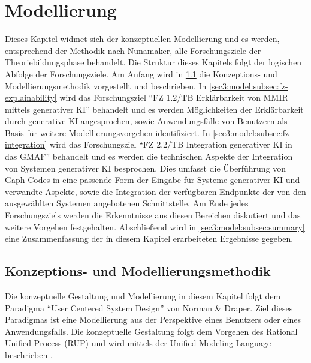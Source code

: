 \section{Modellierung}
\label{sec3:model}
Dieses Kapitel widmet sich der konzeptuellen Modellierung und es werden, entsprechend der Methodik nach Nunamaker, alle Forschungsziele der Theoriebildungsphase behandelt.
Die Struktur dieses Kapitels folgt der logischen Abfolge der Forschungsziele.
Am Anfang wird in \cref{sec3:model:subsec:concept-modeling-methodology} die Konzeptions- und Modellierungsmethodik vorgestellt und beschrieben.
In \cref{sec3:model:subsec:fz-explainability} wird das Forschungsziel \enquote{FZ 1.2/TB Erklärbarkeit von MMIR mittels generativer KI} behandelt und es werden Möglichkeiten der Erklärbarkeit durch generative KI angesprochen, sowie Anwendungsfälle von Benutzern als Basis für weitere Modellierungsvorgehen identifiziert.
In \cref{sec3:model:subsec:fz-integration} wird das Forschungsziel \enquote{FZ 2.2/TB Integration generativer KI in das GMAF} behandelt und es werden die technischen Aspekte der Integration von Systemen generativer KI besprochen.
Dies umfasst die Überführung von Gaph Codes in eine passende Form der Eingabe für Systeme generativer KI und verwandte Aspekte, sowie die Integration der verfügbaren Endpunkte der von den ausgewählten Systemen angebotenen Schnittstelle.
Am Ende jedes Forschungsziels werden die Erkenntnisse aus diesen Bereichen diskutiert und das weitere Vorgehen festgehalten.
Abschließend wird in \cref{sec3:model:subsec:summary} eine Zusammenfassung der in diesem Kapitel erarbeiteten Ergebnisse gegeben.



\subsection{Konzeptions- und Modellierungsmethodik}
\label{sec3:model:subsec:concept-modeling-methodology}
Die konzeptuelle Gestaltung und Modellierung in diesem Kapitel folgt dem Paradigma \enquote{User Centered System Design} \cite{norman-draper-user-centered-system-design} von Norman \& Draper.
Ziel dieses Paradigmas ist eine Modellierung aus der Perspektive eines Benutzers oder eines Anwendungsfalls.
Die konzeptuelle Gestaltung folgt dem Vorgehen des Rational Unified Process (RUP) \cite{rup-quality} und wird mittels der Unified Modeling Language beschrieben \cite{rup-inff}.

